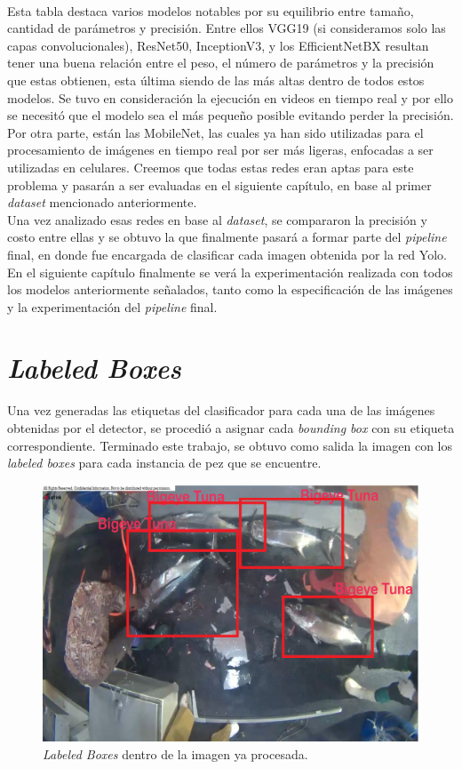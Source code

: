 \\
Esta tabla destaca varios modelos notables por su equilibrio entre 
tamaño, cantidad de parámetros y precisión. Entre ellos VGG19 
(si consideramos solo las capas convolucionales), ResNet50, InceptionV3, 
y los EfficientNetBX resultan tener una buena relación entre el peso, el 
número de parámetros y la precisión que estas obtienen, esta última 
siendo de las más altas dentro de todos estos modelos. Se tuvo en 
consideración la ejecución en videos en tiempo real y por ello se necesitó 
que el modelo sea el más pequeño posible evitando perder la precisión. Por 
otra parte, están las MobileNet, las cuales ya han sido utilizadas para el 
procesamiento de imágenes en tiempo real por ser más ligeras, enfocadas a 
ser utilizadas en celulares. Creemos que todas estas redes eran aptas para 
este problema y pasarán a ser evaluadas en el siguiente capítulo, en base 
al primer \textit{dataset} mencionado anteriormente. \\

Una vez analizado esas redes en base al \textit{dataset}, se compararon 
la precisión y costo entre ellas y se obtuvo la que finalmente pasará a 
formar parte del \textit{pipeline} final, en donde fue encargada de 
clasificar cada imagen obtenida por la red Yolo.\\

En el siguiente capítulo finalmente se verá la experimentación realizada con todos 
los modelos anteriormente señalados, tanto como la especificación de las 
imágenes y la experimentación del \textit{pipeline} final.

\section{\textit{Labeled Boxes}}
Una vez generadas las etiquetas del clasificador para cada una de las 
imágenes obtenidas por el detector, se procedió a asignar cada 
\textit{bounding box} con su etiqueta correspondiente. Terminado este 
trabajo, se obtuvo como salida la imagen con los \textit{labeled boxes} 
para cada instancia de pez que se encuentre. 

\begin{figure}[h!]
    \includegraphics[width=1\textwidth]{images/BoundingBox.png}
    \caption{\textit{Labeled Boxes} dentro de la imagen ya procesada. }
    \label{fig:LabelBoxes}
\end{figure}
